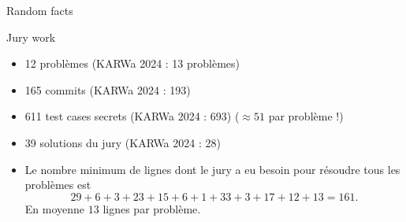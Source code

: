 
\begin{frame}{Random facts}
    \begin{block}{Jury work}
      \begin{itemize}[<+->]
        \item 12 problèmes (KARWa 2024 : 13 problèmes)
        \item 165 commits (KARWa 2024 : 193)
        \item 611 test cases secrets (KARWa 2024 : 693) ($\approx 51$ par problème !)
        \item 39 solutions du jury (KARWa 2024 : 28)
        \item Le nombre minimum de lignes dont le jury a eu besoin pour résoudre tous les problèmes est
        \[ 29+6+3+23+15+6+1+33+3+17+12+13 = 161. \]
        En moyenne $13$ lignes par problème.
      \end{itemize}
    \end{block}
\end{frame}
